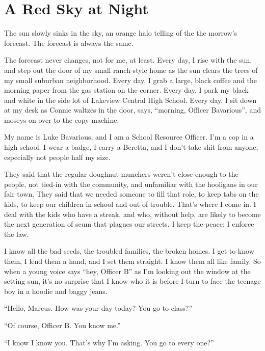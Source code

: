 \chapter{A Red Sky at Night}


The sun slowly sinks in the sky, an orange halo telling of the the
morrow's forecast. The forecast is always the same.



The forecast never changes, not for me, at least. Every day, I rise
with the sun, and step out the door of my small ranch-style home as
the sun clears the trees of my small suburban neighborhood. Every
day, I grab a large, black coffee and the morning paper from the
gas station on the corner. Every day, I park my black and white in
the side lot of Lakeview Central High School. Every day, I sit down
at my desk as Connie waltzes in the door, says, ``morning, Officer
Bavarious'', and moseys on over to the copy machine.



My name is Luke Bavarious, and I am a School Resource Officer. I'm
a cop in a high school. I wear a badge, I carry a Beretta, and I
don't take shit from anyone, especially not people half my
size.



They said that the regular doughnut-munchers weren't close enough
to the people, not tied-in with the community, and unfamiliar with
the hooligans in our fair town. They said that we needed someone to
fill that role, to keep tabs on the kids, to keep our children in
school and out of trouble. That's where I come in. I deal with the
kids who have a streak, and who, without help, are likely to become
the next generation of scum that plagues our streets. I keep the
peace; I enforce the law.



I know all the bad seeds, the troubled families, the broken homes.
I get to know them, I lend them a hand, and I set them straight. I
know them all like family. So when a young voice says ``hey, Officer
B'' as I'm looking out the window at the setting sun, it's no
surprise that I know who it is before I turn to face the teenage
boy in a hoodie and baggy jeans.



``Hello, Marcus. How was your day today? You go to class?''

``Of course, Officer B. You know me.''

``I know I know you. That's why I'm asking. You go to every
one?''

